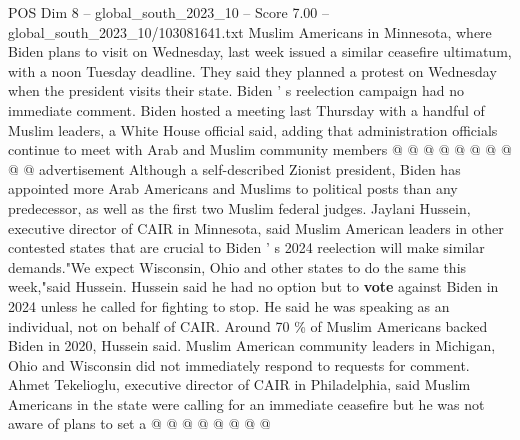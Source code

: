 \begin{textsample}{POS Dim 8 – global\_south\_2023\_10 – Score 7.00 – global\_south\_2023\_10/103081641.txt}
Muslim Americans in Minnesota, where Biden plans to visit on Wednesday, last week issued a similar ceasefire ultimatum, with a noon Tuesday deadline.
They said they planned a protest on Wednesday when the president visits their state.
Biden ' s reelection campaign had no immediate comment.
Biden hosted a meeting last Thursday with a handful of Muslim leaders, a White House official said, adding that administration officials continue to meet with Arab and Muslim community members @ @ @ @ @ @ @ @ @ @ advertisement Although a self-described Zionist president, Biden has appointed more Arab Americans and Muslims to political posts than any predecessor, as well as the first two Muslim federal judges.
Jaylani Hussein, executive director of CAIR in Minnesota, said Muslim American leaders in other contested states that are crucial to Biden ' s 2024 reelection will make similar demands."We expect Wisconsin, Ohio and other states to do the same this week,"said Hussein.
Hussein said he had no option but to \textbf{vote} against Biden in 2024 unless he called for fighting to stop.
He said he was speaking as an individual, not on behalf of CAIR.
Around 70 \% of Muslim Americans backed Biden in 2020, Hussein said.
Muslim American community leaders in Michigan, Ohio and Wisconsin did not immediately respond to requests for comment.
Ahmet Tekelioglu, executive director of CAIR in Philadelphia, said Muslim Americans in the state were calling for an immediate ceasefire but he was not aware of plans to set a @ @ @ @ @ @ @ @

\end{textsample}
